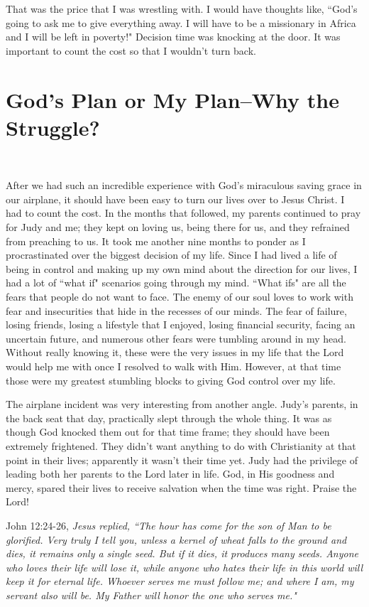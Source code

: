 \documentclass[oneside,12pt]{book}
\begin{document}
That was the price that I was wrestling with. I would have thoughts like, ``God's going to ask me to give everything away. I will have to be a missionary in Africa and I will be left in poverty!" Decision time was knocking at the door. It was important to count the cost so that I wouldn't turn back.


\chapter{God's Plan or My Plan--Why the Struggle?}
\

After we had such an incredible experience with God's miraculous saving grace in our airplane, it should have been easy to turn our lives over to Jesus Christ. I had to count the cost. In the months that followed, my parents continued to pray for Judy and me; they kept on loving us, being there for us, and they refrained from preaching to us. It took me another nine months to ponder as I procrastinated over the biggest decision of my life. Since I had lived a life of being in control and making up my own mind about the direction for our lives, I had a lot of ``what if" scenarios going through my mind. ``What ifs" are all the fears that people do not want to face. The enemy of our soul loves to work with fear and insecurities that hide in the recesses of our minds. The fear of failure, losing friends, losing a lifestyle that I enjoyed, losing financial security, facing an uncertain future, and numerous other fears were tumbling around in my head. Without really knowing it, these were the very issues in my life that the Lord would help me with once I resolved to walk with Him. However, at that time those were my greatest stumbling blocks to giving God control over my life. 

The airplane incident was very interesting from another angle. Judy's parents, in the back seat that day, practically slept through the whole thing. It was as though God knocked them out for that time frame; they should have been extremely frightened. They didn't want anything to do with Christianity at that point in their lives; apparently it wasn't their time yet. Judy had the privilege of leading both her parents to the Lord later in life. God, in His goodness and mercy, spared their lives to receive salvation when the time was right. Praise the Lord!

John 12:24-26, \textit{Jesus replied, ``The hour has come for the son of Man to be glorified. Very truly I tell you, unless a kernel of wheat falls to the ground and dies, it remains only a single seed. But if it dies, it produces many seeds. Anyone who loves their life will lose it, while anyone who hates their life in this world will keep it for eternal life. Whoever serves me must follow me; and  where I am, my servant also will be. My Father will honor the one who serves me."}
\end{document}
